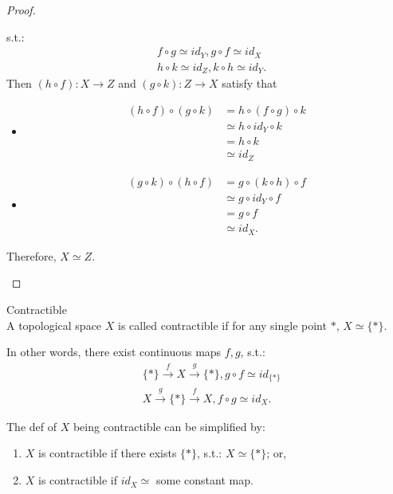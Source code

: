 \begin{proof}
\begin{enumerate}
\begin{itemize}
            s.t.:
            \begin{align*}
                &f \circ g \simeq id_Y, g\circ f \simeq id_X\\
                &h \circ k \simeq id_Z, k\circ h \simeq id_Y.
            \end{align*}
            Then $(h \circ f) : X \rightarrow Z$ and $(g \circ k) : Z \rightarrow X$ satisfy that
            \begin{itemize}
                \item \begin{align*}
                    (h \circ f) \circ (g \circ k) &= h \circ (f \circ g) \circ k\\
                    &\simeq h \circ id_Y \circ k\\
                    &= h\circ k\\
                    &\simeq id_Z
                \end{align*}
                \item \begin{align*}
                    (g \circ k) \circ (h \circ f) &= g \circ (k \circ h) \circ f\\
                    &\simeq g \circ id_Y \circ f\\
                    &= g\circ f\\
                    &\simeq id_X.
                \end{align*}
            \end{itemize}
            Therefore, $X \simeq Z$.
        \end{itemize}
    \end{enumerate}
\end{proof}

\begin{definition}{Contractible}\\
A topological space $X$ is called contractible if for any single point $*$, $X \simeq \{ * \}$.

In other words, there exist continuous maps $f,g$, s.t.:
\begin{align*}
    &\{ * \} \overset{f}{\rightarrow} X \overset{g}{\rightarrow} \{*\}, g \circ f \simeq id_{\{*\}}\\
    &X \overset{g}{\rightarrow} \{*\} \overset{f}{\rightarrow} X, f \circ g \simeq id_{X}.
\end{align*}
\end{definition}

\begin{proposition}
    The def of $X$ being contractible can be simplified by:
    \begin{enumerate}
        \item $X$ is contractible if there exists $\{ * \}$, s.t.: $X \simeq \{ *\}$; or,
        \item $X$ is contractible if $id_X \simeq$ some constant map.
    \end{enumerate}
\end{proposition}

